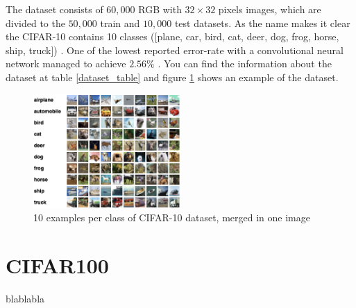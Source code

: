 The dataset consists of $60,000$  RGB with $32 \times 32$ pixels images, which are divided to the $50,000$ train and $10,000$ test datasets. As the name makes it clear the CIFAR-10 contains 10 classes ([plane, car, bird, cat, deer, dog, frog, horse, ship, truck]) \cite{CIFAR-10_dataset_reference}.
One of the lowest reported error-rate with a convolutional neural network managed to achieve $2.56\%$ \cite{CIFAR-10_best_result_reference}.  You can
find the information about the dataset at table
\ref{dataset_table} and figure \ref{fig:cifar-10_dataset_example} shows an example of the dataset.

\begin{figure}
  \centering
  \label{fig:cifar-10_dataset_example}
  \includegraphics[width=0.5\textwidth]{fig/cifar-10}
  \caption{10 examples per class of CIFAR-10 dataset, merged in one image \cite{CIFAR-10_dataset_reference}}
\end{figure}


\section{CIFAR100}
blablabla


